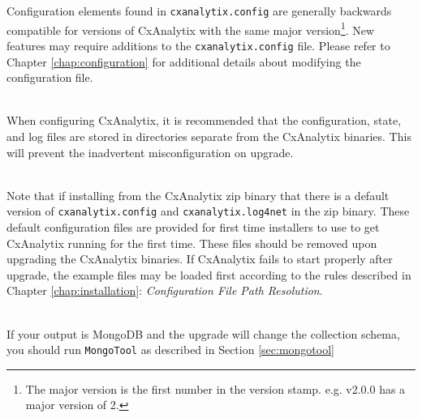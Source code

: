 Configuration elements found in \texttt{cxanalytix.config} are generally backwards compatible for versions
of CxAnalytix with the same major version\footnote{The major version is the first 
number in the version stamp.  e.g. v2.0.0 has a major version of 2.}.  New features may require additions
to the \texttt{cxanalytix.config} file. Please refer to Chapter \ref{chap:configuration} for additional details
about modifying the configuration file.


\noindent\\When configuring CxAnalytix, it is recommended that the configuration, state, and log files are stored
in directories separate from the CxAnalytix binaries.  This will prevent the inadvertent misconfiguration on upgrade.


\noindent\\Note that if installing from the CxAnalytix zip binary that there is a default version of \texttt{cxanalytix.config}
and \texttt{cxanalytix.log4net} in the zip binary.  These default configuration files are provided for first time installers to
use to get CxAnalytix running for the first time.  These files should be removed upon upgrading the CxAnalytix binaries.  If
CxAnalytix fails to start properly after upgrade, the example files may be loaded first according to the rules described in
Chapter \ref{chap:installation}: \textit{Configuration File Path Resolution}.

\noindent\\If your output is MongoDB and the upgrade will change the collection schema, you should run \texttt{MongoTool} as
described in Section \ref{sec:mongotool}